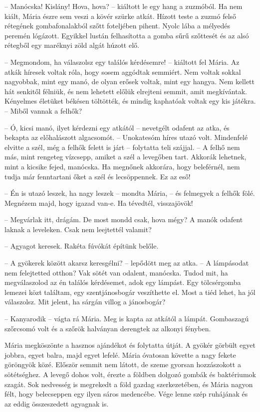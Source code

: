 \documentclass[10pt]{memoir}
\begin{document}
-- Manócska! Kislány! Hova, hova? -- kiáltott le egy hang a zuzmóból. Ha nem
kiált, Mária észre sem veszi a kövér szürke atkát. Hízott teste a zuzmó felső
rétegének gombafonalakból szőtt foteljében pihent. Nyolc lába a mélyedés
peremén lógázott. Egyikkel lustán felhasította a gomba sűrű szőttesét és az
alsó rétegből egy maréknyi zöld algát húzott elő.

-- Megmondom, ha válaszolsz egy találós kérdésemre! -- kiáltott fel Mária. Az
atkák híresek voltak róla, hogy sosem aggódtak semmiért. Nem voltak sokkal
nagyobbak, mint egy manó, de olyan erősek voltak, mint egy hangya. Nem kellett
hát senkitől félniük, és nem lehetett előlük elrejteni semmit, amit
megkívántak. Kényelmes életüket békésen töltötték, és mindig kaphatóak voltak
egy kis játékra. -- Miből vannak a felhők?

-- Ó, kicsi manó, ilyet kérdezni egy atkától -- nevetgélt odafent az atka, és
bekapta az előhalászott algacsomót. -- Unokatesóm híres utazó volt. Mindenfelé
elvitte a szél, még a felhők felett is járt -- folytatta teli szájjal. --  A
felhő nem más, mint rengeteg vízcsepp, amiket a szél a levegőben tart. Akkorák
lehetnek, mint a kicsike fejed, manócska. Ha megnőnek akkorára, hogy
beleférnél, nem tudja már fenntartani őket a szél és lecsöppennek. Ez az eső!

-- Én is utazó leszek, ha nagy leszek -- mondta Mária, -- és felmegyek a
felhők fölé. Megnézem majd, hogy igazad van-e. Ha tévedtél, visszajövök!

-- Megvárlak itt, drágám. De most mondd csak, hova mégy? A manók odafent
laknak a leveleken. Csak nem leejtettél valamit?

-- Agyagot keresek. Rakéta fúvókát építünk belőle.

-- A gyökerek között akarsz keresgélni? -- lepődött meg az atka. -- A
lámpásodat nem felejtetted otthon? Vak sötét van odalent, manócska. Tudod mit,
ha megválaszolod az én találós kérdésemet, adok egy lámpást. Egy tölcsérgomba
lemezei közt találtam, egy szentjánosbogár veszíthette el. Most a tiéd lehet,
ha jól válaszolsz. Mit jelent, ha sárgán villog a jánosbogár?

-- Kanyarodik -- vágta rá Mária. Meg is kapta az atkától a lámpát. Gombaszagú
szőrcsomó volt és a szőrök halványan derengtek az alkonyi fényben.

Mária megköszönte a hasznos ajándékot és folytatta útját. A gyökér görbült
egyet jobbra, egyet balra, majd egyet lefelé. Mária óvatosan követte a nagy
fekete göröngyök közé. Először semmit nem látott, de szeme gyorsan hozzászokott
a sötétséghez. A levegő dohos volt, érezte a földben dolgozó gombák és
baktériumok szagát. Sok nedvesség is megrekedt a föld gazdag szerkezetében, és
Mária nagyon félt, hogy belecseppen egy ilyen sáros medencébe. Vége lenne szép
ruhájának és az eddig összeszedett agyagnak is.
\end{document}
